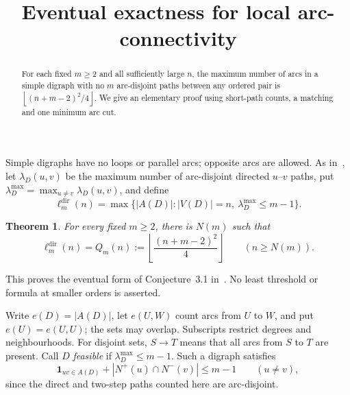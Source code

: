 \documentclass[11pt,a4paper]{amsart}
\title[Eventual exactness for local arc-connectivity]{Eventual exactness for local arc-connectivity}
\author{}
\date{}
\newtheorem{theorem}{Theorem}
\newcommand{\fl}[1]{\left\lfloor#1\right\rfloor}
\newcommand{\ar}{\to}
\newcommand{\Q}{Q_m}
\begin{document}
\begin{abstract}
For each fixed $m\ge2$ and all sufficiently large $n$, the maximum number
of arcs in a simple digraph with no $m$ arc-disjoint paths between any
ordered pair is $\fl{(n+m-2)^2/4}$. We give an elementary proof using
short-path counts, a matching and one minimum arc cut.
\end{abstract}
\maketitle

Simple digraphs have no loops or parallel arcs; opposite arcs are allowed.
As in~\cite{thesis}, let $\lambda_D(u,v)$ be the maximum number of
arc-disjoint directed $u$--$v$ paths, put
$\lambda_D^{\max}=\max_{u\ne v}\lambda_D(u,v)$, and define
\[
 \ell_m^{\mathrm{dir}}(n)
 =\max\{|A(D)|:|V(D)|=n,\ \lambda_D^{\max}\le m-1\}.
\]
\begin{theorem}\label{thm:main}
For every fixed $m\ge2$, there is $N(m)$ such that
\[
 \ell_m^{\mathrm{dir}}(n)=\Q(n):=
 \fl{\frac{(n+m-2)^2}{4}}\qquad(n\ge N(m)).
\]
\end{theorem}
This proves the eventual form of Conjecture~3.1 in~\cite{thesis}.
No least threshold or formula at smaller orders is asserted.

Write $e(D)=|A(D)|$, let $e(U,W)$ count arcs from $U$ to $W$, and put
$e(U)=e(U,U)$; the sets may overlap. Subscripts restrict degrees and
neighbourhoods. For disjoint sets, $S\ar T$ means that all arcs from
$S$ to $T$ are present. Call $D$ \emph{feasible} if
$\lambda_D^{\max}\le m-1$. Such a digraph satisfies
\begin{equation}\label{eq:paths}
 \mathbf1_{uv\in A(D)}+|N^+(u)\cap N^-(v)|\le m-1\qquad(u\ne v),
\end{equation}
since the direct and two-step paths counted here are arc-disjoint.
\end{document}
